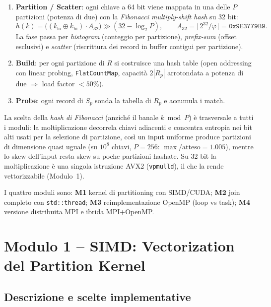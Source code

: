 \documentclass[11pt,a4paper]{article}
\theoremstyle{remark}
\begin{document}
\begin{enumerate}
  \item \textbf{Partition / Scatter}: ogni chiave a 64 bit viene mappata in una delle $P$ partizioni (potenza di due) con la \emph{Fibonacci multiply-shift hash} su 32 bit:
  \[
    h(k) = \bigl((k_\text{lo}\oplus k_\text{hi})\cdot A_{32}\bigr)\gg(32-\log_2 P),\qquad A_{32}=\lfloor 2^{32}/\varphi\rfloor=\texttt{0x9E3779B9}.
  \]
  La fase passa per \emph{histogram} (conteggio per partizione), \emph{prefix-sum} (offset esclusivi) e \emph{scatter} (riscrittura dei record in buffer contigui per partizione).
  \item \textbf{Build}: per ogni partizione di $R$ si costruisce una hash table (open addressing con linear probing, \texttt{FlatCountMap}, capacit\`a $2|R_p|$ arrotondata a potenza di due $\Rightarrow$ load factor $<50\%$).
  \item \textbf{Probe}: ogni record di $S_p$ sonda la tabella di $R_p$ e accumula i match.
\end{enumerate}

La scelta della \emph{hash di Fibonacci} (anzich\'e il banale $k\bmod P$) \`e trasversale a tutti i moduli: la moltiplicazione decorrela chiavi adiacenti e concentra entropia nei bit alti usati per la selezione di partizione, cos\`i un input uniforme produce partizioni di dimensione quasi uguale (su $10^8$ chiavi, $P=256$: $\max/\text{atteso}=1.005$), mentre lo skew dell'input resta skew su poche partizioni hashate. Su 32 bit la moltiplicazione \`e una singola istruzione AVX2 (\texttt{vpmulld}), il che la rende vettorizzabile (Modulo~1).

I quattro moduli sono: \textbf{M1} kernel di partitioning con SIMD/CUDA; \textbf{M2} join completo con \texttt{std::thread}; \textbf{M3} reimplementazione OpenMP (loop vs task); \textbf{M4} versione distribuita MPI e ibrida MPI+OpenMP.

\section{Modulo 1 -- SIMD: Vectorization del Partition Kernel}
\label{sec:m1}

\subsection{Descrizione e scelte implementative}
\end{document}
